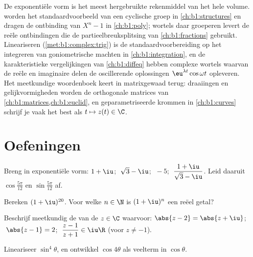 \begin{remark}\label{rem:b1:complex:whereused}
De exponentiële vorm is het meest hergebruikte rekenmiddel van het hele
volume.  worden het standaardvoorbeeld van een cyclische
groep in \cref{ch:b1:structures} en dragen de ontbinding van $X^n - 1$
in \cref{ch:b1:poly};  wortels daar groeperen levert de reële
ontbindingen die de partieelbreuksplitsing van \cref{ch:b1:fractions}
gebruikt. Lineariseren (\cref{met:b1:complex:trig}) is de
standaardvoorbereiding op het integreren van goniometrische machten in
\cref{ch:b1:integration}, en de karakteristieke vergelijkingen van
\cref{ch:b1:diffeq} hebben complexe wortels waarvan de reële en
imaginaire delen de oscillerende oplossingen $\eu^{\lambda t}\cos\omega
t$ opleveren. Het meetkundige woordenboek keert in matrixgewaad terug:
draaiingen en gelijkvormigheden worden de orthogonale matrices van
\cref{ch:b1:matrices,ch:b1:euclid}, en geparametriseerde krommen in
\cref{ch:b1:curves} schrijf je vaak het best als  $t \mapsto
z(t) \in \C$.
\end{remark}

\section{Oefeningen}

\begin{exercise}[$\star$]\label{exo:b1:complex:1}
Breng in exponentiële vorm: $1 + \iu$; $\;\sqrt 3 - \iu$; $\;-5$;
$\;\dfrac{1 + \iu}{\sqrt 3 - \iu}$. Leid daaruit
$\cos\frac{5\pi}{12}$ en $\sin\frac{5\pi}{12}$ af.
\end{exercise}

\begin{exercise}[$\star$]\label{exo:b1:complex:2}
Bereken $(1 + \iu)^{20}$. Voor welke $n \in \N$ is $(1 + \iu)^n$ een
reëel getal?
\end{exercise}

\begin{exercise}[$\star$]\label{exo:b1:complex:3}
Beschrijf meetkundig de  van de $z \in \C$ waarvoor:
$\abs{z - 2} = \abs{z + \iu}$; $\;\abs{z - 1} = 2$;
$\;\dfrac{z - 1}{z + 1} \in \iu\R$ (voor $z \neq -1$).
\end{exercise}

\begin{exercise}[$\star$]\label{exo:b1:complex:4}
Lineariseer $\sin^4\theta$, en ontwikkel $\cos 4\theta$ als veelterm in
$\cos\theta$.
\end{exercise}

